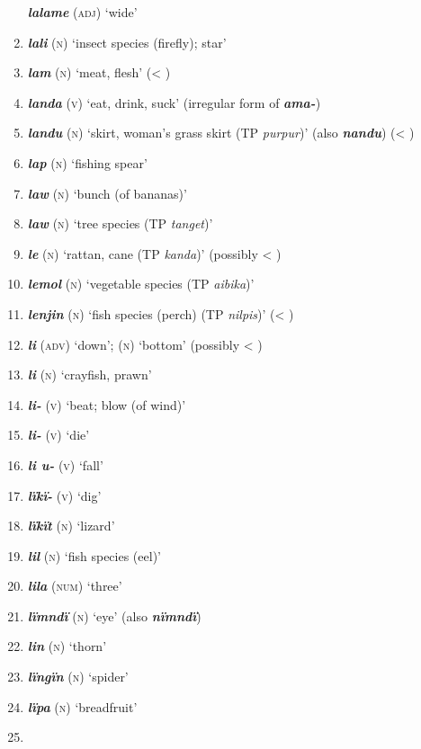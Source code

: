 \begin{enumerate}[noitemsep, label={}, align=left, widest=190, labelsep=1ex,leftmargin=*,itemindent=-10pt]
\textbf{\textit{lalame}} (\textsc{adj)} ‘wide’ \item
\textbf{\textit{lali}} (\textsc{n)} ‘insect species (firefly); star’ \item
\textbf{\textit{lam}} (\textsc{n)} ‘meat, flesh’ (< ) \item
\textbf{\textit{landa}} (\textsc{v)} ‘eat, drink, suck’ (irregular  form of \textbf{\textit{ama-}}) \item
\textbf{\textit{landu}} (\textsc{n)} ‘skirt, woman’s grass skirt (TP \textit{purpur})’ (also \textbf{\textit{nandu}}) (< ) \item
\textbf{\textit{lap}} (\textsc{n)} ‘fishing spear’ \item
\textbf{\textit{law}} (\textsc{n)} ‘bunch (of bananas)’ \item
\textbf{\textit{law}} (\textsc{n)} ‘tree species (TP \textit{tanget})’ \item
\textbf{\textit{le}} (\textsc{n)} ‘rattan, cane (TP \textit{kanda})’ (possibly < ) \item
\textbf{\textit{lemol}} (\textsc{n)} ‘vegetable species (TP \textit{aibika})’ \item
\textbf{\textit{lenjin}} (\textsc{n)} ‘fish species (perch) (TP \textit{nilpis})’ (< ) \item
\textbf{\textit{li}} (\textsc{adv}) ‘down’; (\textsc{n}) ‘bottom’ (possibly < ) \item
\textbf{\textit{li}} \textsc{(n)} ‘crayfish, prawn’ \item
\textbf{\textit{li-}} (\textsc{v}) ‘beat; blow (of wind)’ \item
\textbf{\textit{li-}} (\textsc{v}) ‘die’ \item
\textbf{\textit{li u-}} (\textsc{v}) ‘fall’ \item
\textbf{\textit{lïkï-}} (\textsc{v}) ‘dig’ \item
\textbf{\textit{lïkït}} (\textsc{n}) ‘lizard’ \item
\textbf{\textit{lil}} (\textsc{n}) ‘fish species (eel)’ \item
\textbf{\textit{lila}} (\textsc{num}) ‘three’ \item
\textbf{\textit{lïmndï}} (\textsc{n}) ‘eye’ (also \textbf{\textit{nïmndï}}) \item
\textbf{\textit{lin}} (\textsc{n}) ‘thorn’ \item
\textbf{\textit{lïngïn}} (\textsc{n}) ‘spider’ \item
\textbf{\textit{lïpa}} (\textsc{n}) ‘breadfruit’ \item

\end{enumerate}
